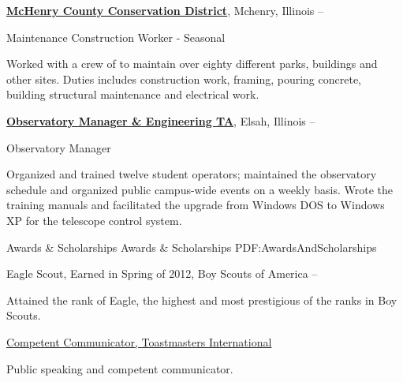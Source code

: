 \documentclass[a4paper,MMMyyyy,nonstopmode]{simpleresumecv}
\begin{document}
\begin{Body}

\href{http://www.mccdistrict.org/rccms/}
{\textbf{
McHenry County Conservation District}},
Mchenry, Illinois
\hfill {} --

\Gap
\BulletItem
Maintenance Construction Worker - Seasonal 
\begin{Detail}
\SubBulletItem
Worked with a crew of to maintain over eighty different parks, buildings and other sites. Duties includes construction work, framing, pouring concrete, building structural maintenance and electrical work.
\end{Detail}


\href{http://www.mccdistrict.org/rccms/}
{\textbf{Observatory Manager \& Engineering TA}},
Elsah, Illinois
\hfill
{} --

\Gap
\BulletItem
Observatory Manager

\begin{Detail}
\SubBulletItem
Organized and trained twelve student operators; maintained the observatory schedule and organized public campus-wide events on a weekly basis.
\SubBulletItem
Wrote the training manuals and facilitated the upgrade from Windows DOS to Windows XP for the telescope control system.
\end{Detail}


\Section
{Awards \&\newline
Scholarships}
{Awards \& Scholarships}
{PDF:AwardsAndScholarships}

\BulletItem
Eagle Scout,
Earned in Spring of 2012,
Boy Scouts of America
\hfill
{} --
\begin{Detail}
\Item
Attained the rank of Eagle, the highest and most prestigious of the ranks in Boy Scouts.
\end{Detail}

\Gap
\BulletItem
\href{https://www.toastmasters.org/Education/Communication-Track}{Competent Communicator,
Toastmasters International}
\hfill
{}
\begin{Detail}
\Item
Public speaking and competent communicator.
\end{Detail}



\end{Body}
\end{document}

